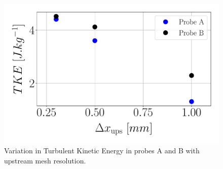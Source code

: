 \begin{figure}[ht]
	\centering
	\includegraphics[scale=0.28]{./part2_developments/figures_ch5_resolved_JICF/results_ics_mesh_convergence_probes/TKE_vs_dx_in_probes.pdf}
   \caption{Variation in Turbulent Kinetic Energy in probes A and B with upstream mesh resolution.}
   \label{fig:TKE_vs_dx_in_probes}
\end{figure}


